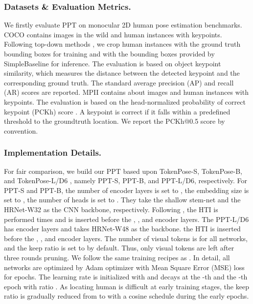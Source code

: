 \documentclass[runningheads]{llncs}
\begin{document}
\subsubsection{Datasets \& Evaluation Metrics. } 
We firstly evaluate PPT on monocular 2D human pose estimation benchmarks. 
COCO \cite{lin2014microsoft} contains  images in the wild and  human instances with  keypoints. Following top-down methods \cite{xiao2018simple,sun2019deep,li2021tokenpose}, we crop human instances with the ground truth bounding boxes for training and with the bounding boxes provided by SimpleBaseline \cite{xiao2018simple} for inference.   
The evaluation is based on object keypoint similarity, which measures the distance between the detected keypoint and the corresponding ground truth. The standard average precision (AP) and recall (AR) scores are reported.  
MPII \cite{andriluka14cvpr} contains about  images and  human instances with  keypoints. The evaluation is based on the head-normalized probability of correct keypoint (PCKh) score \cite{andriluka14cvpr}. 
A keypoint is correct if it falls within a predefined threshold to the groundtruth location. We report the PCKh@0.5 score by convention.


\vspace{-0.5em}
\subsubsection{Implementation Details. } 
For fair comparison, we build our PPT based upon TokenPose-S, TokenPose-B, and TokenPose-L/D6 \cite{li2021tokenpose}, namely PPT-S, PPT-B, and PPT-L/D6, respectively. 
For PPT-S and PPT-B, the number of encoder layers  is set to , the embedding size  is set to , the number of heads  is set to . 
They take the shallow stem-net and the HRNet-W32 as the CNN backbone, respectively.  
Following \cite{rao2021dynamicvit,liang2022evit}, the HTI is performed  times and is inserted before the , , and  encoder layers. 
The PPT-L/D6 has  encoder layers and takes HRNet-W48 as the backbone. the HTI is inserted before the , , and  encoder layers. 
The number of visual tokens  is  for all networks, and the keep ratio  is set to  by default. Thus, only  visual tokens are left after three rounds pruning.
We follow the same training recipes as \cite{li2021tokenpose}. 
In detail, all networks are optimized by Adam optimizer \cite{kingma2014adam} with Mean Square Error (MSE) loss for  epochs. 
The learning rate is initialized with  and decays at the -th and the -th epoch with ratio . 
As locating human is difficult at early training stages, the keep ratio is gradually reduced from  to  with a cosine schedule during the early  epochs. 
\end{document}

